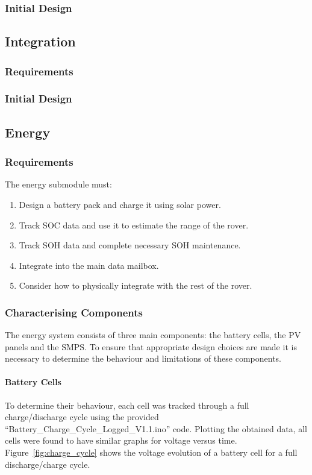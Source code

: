 \documentclass[a4paper]{article}
\begin{document}
\subsubsection{Initial Design}


\subsection{Integration}
\subsubsection{Requirements}
\subsubsection{Initial Design}

\subsection{Energy}
\subsubsection{Requirements}
The energy submodule must:
\begin{enumerate}
    \item Design a battery pack and charge it using solar power.
    \item Track SOC data and use it to estimate the range of the rover.
    \item Track SOH data and complete necessary SOH maintenance.
    \item Integrate into the main data mailbox.
    \item Consider how to physically integrate with the rest of the rover.
\end{enumerate}

\subsubsection{Characterising Components}
The energy system consists of three main components: the battery cells, the 
PV panels and the SMPS. To ensure that appropriate design choices are made 
it is necessary to determine the behaviour and limitations of these components.

\paragraph*{Battery Cells}
To determine their behaviour, each cell was tracked through a full charge/discharge 
cycle using the provided “Battery\_Charge\_Cycle\_Logged\_V1.1.ino” 
code\cite{chargeCode}. Plotting the obtained data, all cells were found to 
have similar graphs for voltage versus time. Figure~\ref{fig:charge_cycle} 
shows the voltage evolution of a battery cell for a full discharge/charge cycle.
\end{document}
